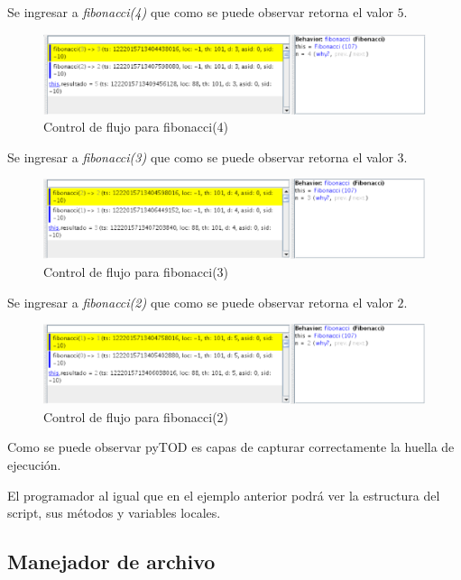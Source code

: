 \documentclass[12pt,legalpaper]{report}
\begin{document}
Se ingresar a \textit{fibonacci(4)} que como se puede observar retorna el valor $5$.

\begin{figure}[!h]
	\centering
	\includegraphics[scale=0.5]{images/fibonacci/fibonacci4.eps}
	\caption{Control de flujo para fibonacci(4)}
\end{figure}

Se ingresar a \textit{fibonacci(3)} que como se puede observar retorna el valor $3$.

\begin{figure}[!h]
	\centering
	\includegraphics[scale=0.5]{images/fibonacci/fibonacci3.eps}
	\caption{Control de flujo para fibonacci(3)}
\end{figure}

Se ingresar a \textit{fibonacci(2)} que como se puede observar retorna el valor $2$.

\begin{figure}[!h]
	\centering
	\includegraphics[scale=0.5]{images/fibonacci/fibonacci2.eps}
	\caption{Control de flujo para fibonacci(2)}
\end{figure}

Como se puede observar pyTOD es capas de capturar correctamente la huella de ejecución.

El programador al igual que en el ejemplo anterior podrá ver la estructura del script, sus métodos y variables locales.

		\subsection{Manejador de archivo}
\end{document}
